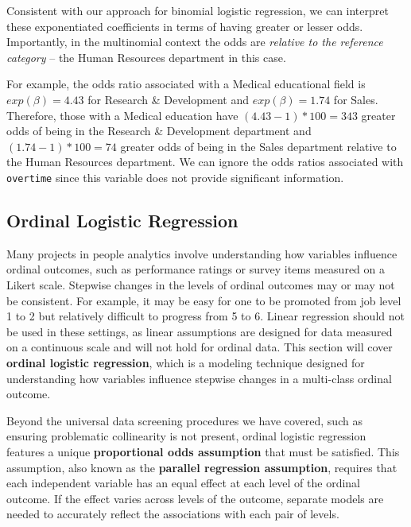 \documentclass[
]{book}
\begin{document}
Consistent with our approach for binomial logistic regression, we can interpret these exponentiated coefficients in terms of having greater or lesser odds. Importantly, in the multinomial context the odds are \emph{relative to the reference category} -- the Human Resources department in this case.

For example, the odds ratio associated with a Medical educational field is \(exp(\beta) = 4.43\) for Research \& Development and \(exp(\beta) = 1.74\) for Sales. Therefore, those with a Medical education have \((4.43 - 1) * 100 = 343%
\) greater odds of being in the Research \& Development department and \((1.74 - 1) * 100 = 74%
\) greater odds of being in the Sales department relative to the Human Resources department. We can ignore the odds ratios associated with \texttt{overtime} since this variable does not provide significant information.

\hypertarget{ordinal-logistic-regression}{%
\subsection{Ordinal Logistic Regression}\label{ordinal-logistic-regression}}

Many projects in people analytics involve understanding how variables influence ordinal outcomes, such as performance ratings or survey items measured on a Likert scale. Stepwise changes in the levels of ordinal outcomes may or may not be consistent. For example, it may be easy for one to be promoted from job level 1 to 2 but relatively difficult to progress from 5 to 6. Linear regression should not be used in these settings, as linear assumptions are designed for data measured on a continuous scale and will not hold for ordinal data. This section will cover \textbf{ordinal logistic regression}, which is a modeling technique designed for understanding how variables influence stepwise changes in a multi-class ordinal outcome.

Beyond the universal data screening procedures we have covered, such as ensuring problematic collinearity is not present, ordinal logistic regression features a unique \textbf{proportional odds assumption} that must be satisfied. This assumption, also known as the \textbf{parallel regression assumption}, requires that each independent variable has an equal effect at each level of the ordinal outcome. If the effect varies across levels of the outcome, separate models are needed to accurately reflect the associations with each pair of levels.
\end{document}
